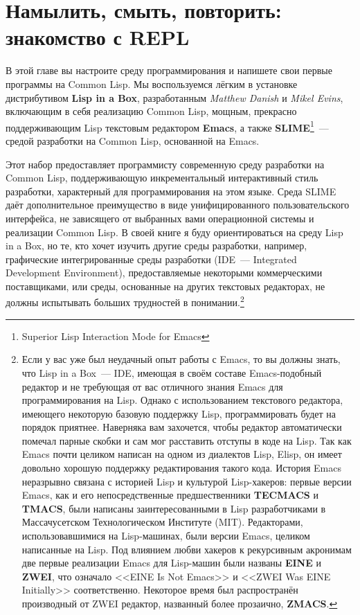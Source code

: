 \chapter{Намылить, смыть, повторить: знакомство с REPL}
\label{ch:02}

В этой главе вы настроите среду программирования и напишете свои первые программы на
Common Lisp. Мы воспользуемся лёгким в установке дистрибутивом \textbf{Lisp in a Box},
разработанным \textit{Matthew Danish} и \textit{Mikel Evins}, включающим в себя реализацию
Common Lisp, мощным, прекрасно поддерживающим Lisp текстовым редактором \textbf{Emacs}, а
также \textbf{SLIME}\footnote{Superior Lisp Interaction Mode for Emacs}~--- средой
разработки на Common Lisp, основанной на Emacs.

Этот набор предоставляет программисту современную среду разработки на Common Lisp,
поддерживающую инкрементальный интерактивный стиль разработки, характерный для
программирования на этом языке. Среда SLIME даёт дополнительное преимущество в виде
унифицированного пользовательского интерфейса, не зависящего от выбранных вами
операционной системы и реализации Common Lisp. В своей книге я буду ориентироваться на
среду Lisp in a Box, но те, кто хочет изучить другие среды разработки, например,
графические интегрированные среды разработки (IDE~--- Integrated Development Environment),
предоставляемые некоторыми коммерческими поставщиками, или среды, основанные на других
текстовых редакторах, не должны испытывать больших трудностей в понимании.\footnote{Если у
  вас уже был неудачный опыт работы с Emacs, то вы должны знать, что Lisp in a Box~---
  IDE, имеющая в своём составе Emacs-подобный редактор и не требующая от вас отличного
  знания Emacs для программирования на Lisp. Однако с использованием текстового редактора,
  имеющего некоторую базовую поддержку Lisp, программировать будет на порядок
  приятнее. Наверняка вам захочется, чтобы редактор автоматически помечал парные скобки и
  сам мог расставить отступы в коде на Lisp. Так как Emacs почти целиком написан на одном
  из диалектов Lisp, Elisp, он имеет довольно хорошую поддержку редактирования такого
  кода. История Emacs неразрывно связана с историей Lisp и культурой Lisp-хакеров: первые
  версии Emacs, как и его непосредственные предшественники \textbf{TECMACS} и
  \textbf{TMACS}, были написаны заинтересованными в Lisp разработчиками в Массачусетском
  Технологическом Институте (MIT). Редакторами, использовавшимися на Lisp-машинах, были
  версии Emacs, целиком написанные на Lisp. Под влиянием любви хакеров к рекурсивным
  акронимам две первые реализации Emacs для Lisp-машин были названы \textbf{EINE} и
  \textbf{ZWEI}, что означало <<EINE Is Not Emacs>> и <<ZWEI Was EINE Initially>>
  соответственно. Некоторое время был распространён производный от ZWEI редактор,
  названный более прозаично, \textbf{ZMACS}.}

